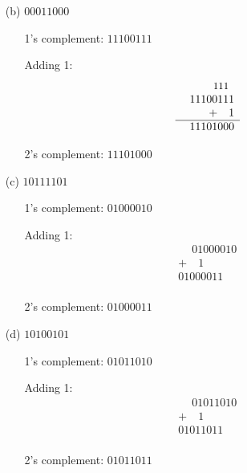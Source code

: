 \documentclass[a4paper,12pt]{article}
\begin{document}
\begin{enumerate}
\begin{enumerate}
    \item[(b)] $00011000$
        \begin{itemize}
            \item[\ding{221}] 1’s complement: $11100111$
            \item[\ding{105}] Adding 1:
                  \[
                  \begin{array}{r}
                    \quad \text{\small 111}\phantom{0} \\
                    \phantom{+}11100111 \\
                    +\quad 1 \\
                    \hline
                    11101000 \\
                  \end{array}
                  \]
            \item[\ding{221}] 2’s complement: $11101000$
        \end{itemize}

    \item[(c)] $10111101$
        \begin{itemize}
            \item[\ding{221}] 1’s complement: $01000010$
            \item[\ding{105}] Adding 1:
                  \[
                  \begin{array}{r}
                    \phantom{+}01000010 \\
                    +\quad 1 \\
                    \hline
                    01000011 \\
                  \end{array}
                  \]
            \item[\ding{221}] 2’s complement: $01000011$
        \end{itemize}

    \item[(d)] $10100101$
        \begin{itemize}
            \item[\ding{221}] 1’s complement: $01011010$
            \item[\ding{105}] Adding 1:
                  \[
                  \begin{array}{r}
                    \phantom{+}01011010 \\
                    +\quad 1 \\
                    \hline
                    01011011 \\
                  \end{array}
                  \]
            \item[\ding{221}] 2’s complement: $01011011$
        \end{itemize}


\end{enumerate}
\end{enumerate}
\end{document}
